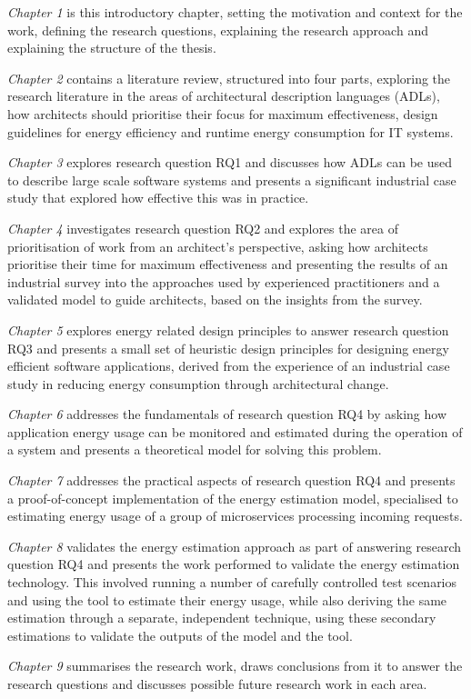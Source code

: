 \emph{Chapter 1} is this introductory chapter, setting the motivation and context for the work, defining the research questions, explaining the research approach and explaining the structure of the thesis.

\emph{Chapter 2} contains a literature review, structured into four parts, exploring the research literature in the areas of architectural description languages (ADLs), how architects should prioritise their focus for maximum effectiveness, design guidelines for energy efficiency and runtime energy consumption for IT systems.

\emph{Chapter 3} explores research question RQ1 and discusses how ADLs can be used to describe large scale software systems and presents a significant industrial case study that explored how effective this was in practice.

\emph{Chapter 4} investigates research question RQ2 and explores the area of prioritisation of work from an architect's perspective, asking how architects prioritise their time for maximum effectiveness and presenting the results of an industrial survey into the approaches used by experienced practitioners and a validated model to guide architects, based on the insights from the survey.

\emph{Chapter 5} explores energy related design principles to answer research question RQ3 and presents a small set of heuristic design principles for designing energy efficient software applications, derived from the experience of an industrial case study in reducing energy consumption through architectural change.

\emph{Chapter 6} addresses the fundamentals of research question RQ4 by asking how application energy usage can be monitored and estimated during the operation of a system and presents a theoretical model for solving this problem.

\emph {Chapter 7} addresses the practical aspects of research question RQ4 and presents a proof-of-concept implementation of the energy estimation model, specialised to estimating energy usage of a group of microservices processing incoming requests.

\emph{Chapter 8} validates the energy estimation approach as part of answering research question RQ4 and presents the work performed to validate the energy estimation technology. This involved running a number of carefully controlled test scenarios and using the tool to estimate their energy usage, while also deriving the same estimation through a separate, independent technique, using these secondary estimations to validate the outputs of the model and the tool.

\emph {Chapter 9} summarises the research work, draws conclusions from it to answer the research questions and discusses possible future research work in each area.



